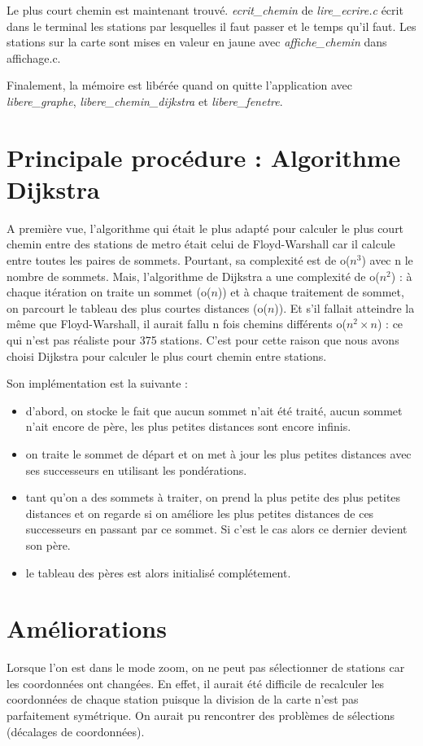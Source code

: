 \documentclass[a4]{article}
\begin{document}
Le plus court chemin est maintenant trouvé. \emph{ecrit\_chemin} de \textit{lire\_ecrire.c} écrit dans le terminal les stations par lesquelles il faut passer et le temps qu'il faut. 
Les stations sur la carte sont mises en valeur en jaune avec \emph{affiche\_chemin} dans affichage.c.

Finalement, la mémoire est libérée quand on quitte l'application avec \emph{libere\_graphe}, 
\emph{libere\_chemin\_dijkstra} et \emph{libere\_fenetre}.\newline

\section{Principale procédure : Algorithme Dijkstra}
A première vue, l'algorithme qui était le plus adapté pour calculer le plus court chemin 
entre des stations de metro était celui de Floyd-Warshall car il calcule entre toutes les paires de sommets. 
Pourtant, sa complexité est de o($n^{3}$) avec n le nombre de sommets. \newline
Mais, l'algorithme de Dijkstra a une complexité de o($n^{2}$) : à chaque itération on traite un sommet (o($n$)) et à chaque traitement de sommet, on parcourt 
le tableau des plus courtes distances (o($n$)). 
Et s'il fallait atteindre la même que Floyd-Warshall, il aurait fallu n fois chemins différents 
o($n^{2}\times n$) : ce qui n'est pas réaliste pour 375 stations. \newline
C'est pour cette raison que nous avons choisi Dijkstra pour calculer le plus court chemin entre stations. \newline \newline \newline

Son implémentation est la suivante : 
\begin{itemize}
\item d'abord, on stocke le fait que aucun sommet n'ait été traité, aucun 
sommet n'ait encore de père, les plus petites distances sont encore infinis. 
\item on traite le sommet de départ et on met à jour les plus petites distances 
avec ses successeurs en utilisant les pondérations. 
\item tant qu'on a des sommets à traiter, on prend la plus petite des plus petites distances 
et on regarde si on améliore les plus petites distances de ces successeurs en passant par ce sommet. 
Si c'est le cas alors ce dernier devient son père. 
\item le tableau des pères est alors initialisé complétement.
\end{itemize}

\section{Améliorations}
Lorsque l'on est dans le mode zoom, on ne peut pas sélectionner de stations car les coordonnées ont changées. 
En effet, il aurait été difficile de recalculer les coordonnées de chaque station puisque la division de la carte 
n'est pas parfaitement symétrique. On aurait pu rencontrer des problèmes de sélections (décalages de coordonnées).
\end{document}

